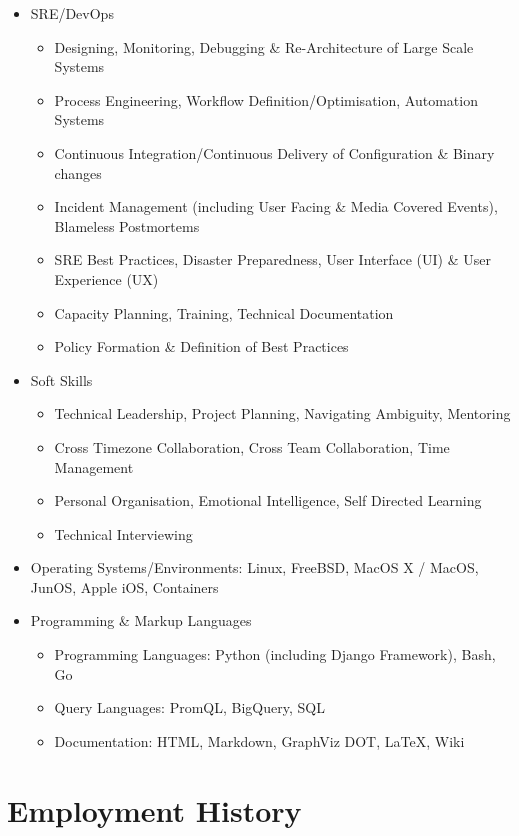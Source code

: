 \documentclass[a4paper, 10pt] {article}
\begin{document}
\begin{itemize}
\item SRE/DevOps
  \begin{itemize}
  \item Designing, Monitoring, Debugging \& Re-Architecture of Large Scale Systems
  \item Process Engineering, Workflow Definition/Optimisation, Automation Systems
  \item Continuous Integration/Continuous Delivery of Configuration \& Binary changes
  \item Incident Management (including User Facing \& Media Covered Events), Blameless Postmortems
  \item SRE Best Practices, Disaster Preparedness, User Interface (UI) \& User Experience (UX)
  \item Capacity Planning, Training, Technical Documentation
  \item Policy Formation \& Definition of Best Practices
  \end{itemize}
\item Soft Skills
  \begin{itemize}
  \item Technical Leadership, Project Planning, Navigating Ambiguity, Mentoring
  \item Cross Timezone Collaboration, Cross Team Collaboration, Time Management
  \item Personal Organisation, Emotional Intelligence, Self Directed Learning
  \item Technical Interviewing
  \end{itemize}
  \item Operating Systems/Environments: Linux, FreeBSD, MacOS X / MacOS, JunOS, Apple iOS, Containers
\item Programming \& Markup Languages
  \begin{itemize}
  \item Programming Languages: Python (including Django Framework), Bash, Go
  \item Query Languages: PromQL, BigQuery, SQL
  \item Documentation: HTML, Markdown, GraphViz DOT, \LaTeX, Wiki
  \end{itemize}
\end{itemize}  

\hrulefill

\section*{Employment History}
\end{document}
